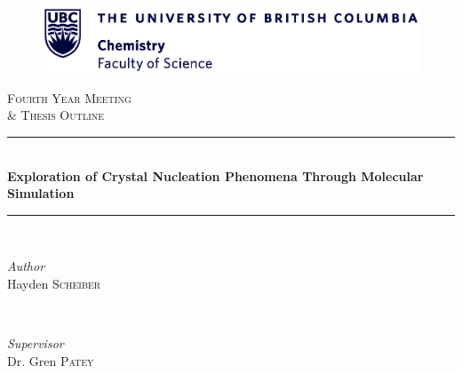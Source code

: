 
\begin{titlepage} %
	\newcommand{\HRule}{\rule{\linewidth}{0.5mm}} %
	
	\center %
	\begin{figure}
		\centering
		\includegraphics[width=\textwidth]{figures/UBC_Chemlogo.eps}
	\end{figure}
	
	
	
	\textsc{\LARGE Fourth Year Meeting\\ \vspace{1em}  \& Thesis Outline}\\[1.5cm] %
	
	
	
	\HRule\\[0.4cm]
	
	{\huge\bfseries Exploration of Crystal Nucleation Phenomena Through Molecular Simulation}\\[0.4cm] %
	
	\HRule\\[1.5cm]
	
	
	\begin{minipage}{0.4\textwidth}
		\begin{flushleft}
			\large
			\textit{Author}\\
			Hayden \textsc{Scheiber} %
		\end{flushleft}
	\end{minipage}
	~
	\begin{minipage}{0.4\textwidth}
		\begin{flushright}
			\large
			\textit{Supervisor}\\
			Dr. Gren \textsc{Patey} %
		\end{flushright}
	\end{minipage}\\


\end{titlepage}
